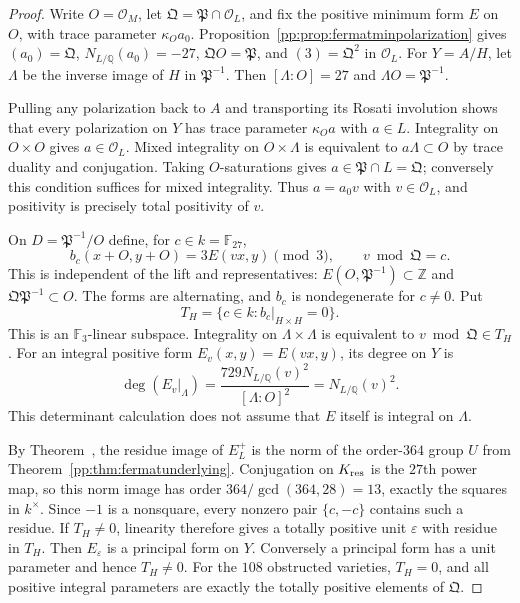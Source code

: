 \begin{proof}
Write $O=\mathcal O_M$, let $\mathfrak Q=\mathfrak P\cap\mathcal O_L$,
and fix the positive minimum form $E$ on $O$, with trace parameter
$\kappa_Oa_0$. Proposition~\ref{pp:prop:fermatminpolarization} gives
$(a_0)=\mathfrak Q$, $N_{L/\mathbb Q}(a_0)=-27$,
$\mathfrak QO=\mathfrak P$, and $(3)=\mathfrak Q^2$ in $\mathcal O_L$.
For $Y=A/H$, let $\Lambda$ be the inverse image of $H$ in
$\mathfrak P^{-1}$. Then $[\Lambda:O]=27$ and
$\Lambda O=\mathfrak P^{-1}$.

Pulling any polarization back to $A$ and transporting its Rosati
involution shows that every polarization on $Y$ has trace parameter
$\kappa_Oa$ with $a\in L$. Integrality on $O\times O$ gives
$a\in\mathcal O_L$. Mixed integrality on $O\times\Lambda$ is
equivalent to $a\Lambda\subset O$ by trace duality and conjugation.
Taking $O$-saturations gives $a\in\mathfrak P\cap L=\mathfrak Q$;
conversely this condition suffices for mixed integrality.
Thus $a=a_0v$ with $v\in\mathcal O_L$, and positivity is precisely
total positivity of $v$.

On $D=\mathfrak P^{-1}/O$ define, for $c\in k=\mathbb F_{27}$,
\[
 b_c(x+O,y+O)=3E(vx,y)\pmod3,\qquad v\bmod\mathfrak Q=c.
\]
This is independent of the lift and representatives: $E(O,\mathfrak
P^{-1})\subset\mathbb Z$ and $\mathfrak Q\mathfrak P^{-1}\subset O$.
The forms are alternating, and $b_c$ is nondegenerate for $c\ne0$.
Put
\[
 T_H=\{c\in k:b_c|_{H\times H}=0\}.
\]
This is an $\mathbb F_3$-linear subspace. Integrality on
$\Lambda\times\Lambda$ is equivalent to $v\bmod\mathfrak Q\in T_H$.
For an integral positive form $E_v(x,y)=E(vx,y)$, its degree on $Y$ is
\[
 \deg(E_v|_\Lambda)
 =\frac{729N_{L/\mathbb Q}(v)^2}{[\Lambda:O]^2}
 =N_{L/\mathbb Q}(v)^2.
\]
This determinant calculation does not assume that $E$ itself is
integral on $\Lambda$.

By Theorem~, the residue image of $E_L^+$ is the
norm of the order-$364$ group $U$ from
Theorem~\ref{pp:thm:fermatunderlying}. Conjugation on $K_{\rm res}$
is the $27$th power map, so this norm image has order
$364/\gcd(364,28)=13$, exactly the squares in $k^\times$.
Since $-1$ is a nonsquare, every nonzero pair $\{c,-c\}$ contains
such a residue. If $T_H\ne0$, linearity therefore gives a totally
positive unit $\varepsilon$ with residue in $T_H$. Then $E_\varepsilon$
is a principal form on $Y$. Conversely a principal form has a unit
parameter and hence $T_H\ne0$. For the $108$ obstructed varieties,
$T_H=0$, and all positive integral parameters are exactly the totally
positive elements of $\mathfrak Q$.


\end{proof}
